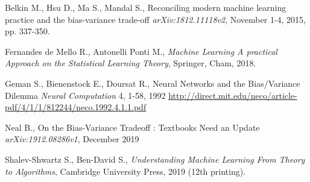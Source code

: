 \documentclass[a4paper]{article}
\begin{document}
\begin{thebibliography}{9}
	
	Belkin M., Hsu D., Ma S., Mandal S.,
	Reconciling modern machine learning practice and the bias-variance trade-off
	\textit{arXiv:1812.11118v2}, November 1-4, 2015, pp. 337-350.
	
	Fernandes de Mello R., Antonelli Ponti M.,
	\textit{Machine Learning A practical Approach on the Statistical Learning Theory},
	Springer, Cham, 2018.
	
	Geman S., Bienenstock E., Doursat R.,
	Neural Networks and the Bias/Variance Dilemma
	\textit{Neural Computation} 4, 1-58, 1992
	\url{http://direct.mit.edu/neco/article-pdf/4/1/1/812244/neco.1992.4.1.1.pdf}
	
	Neal B.,
	On the Bias-Variance Tradeoff : Textbooks Need an Update
	\textit{arXiv:1912.08286v1}, December 2019
	
	Shalev-Shwartz S., Ben-David S.,
	\textit{Understanding Machine Learning From Theory to Algorithms},
	Cambridge University Press, 2019 (12th printing).
	
	
\end{thebibliography}
\newpage

\listoffigures
\newpage
\end{document}
